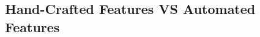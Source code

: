 \documentclass[journal,article,submit,moreauthors,pdftex]{Definitions/mdpi}
\newcommand{\hosein}[1]{\textcolor{orange}{{\it [Hosein: #1]}}}
\begin{document}
\subsection{Hand-Crafted Features VS Automated Features}
\end{document}
